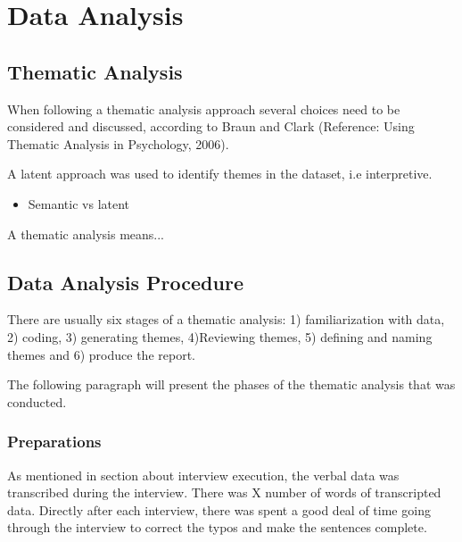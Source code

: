 \section{Data Analysis}
    \subsection{Thematic Analysis}
    When following a thematic analysis approach several choices need to be considered and discussed, according to Braun and Clark (Reference: Using Thematic Analysis in Psychology, 2006). 
    
    A latent approach was used to identify themes in the dataset, i.e interpretive.  
    
\begin{itemize}
\item     Semantic vs latent
\end{itemize}
    A thematic analysis means... 
    
    \subsection{Data Analysis Procedure}
    There are usually six stages of a thematic analysis: 1) familiarization with data, 2) coding, 3) generating themes, 4)Reviewing themes, 5) defining and naming themes and 6) produce the report.
    
    The following paragraph will present the phases of the thematic analysis that was conducted. 
    
    \subsubsection{Preparations}
    As mentioned in section about interview execution, the verbal data was transcribed during the interview. There was X number of words of transcripted data. 
    Directly after each interview, there was spent a good deal of time going through the interview to correct the typos and make the sentences complete. 

